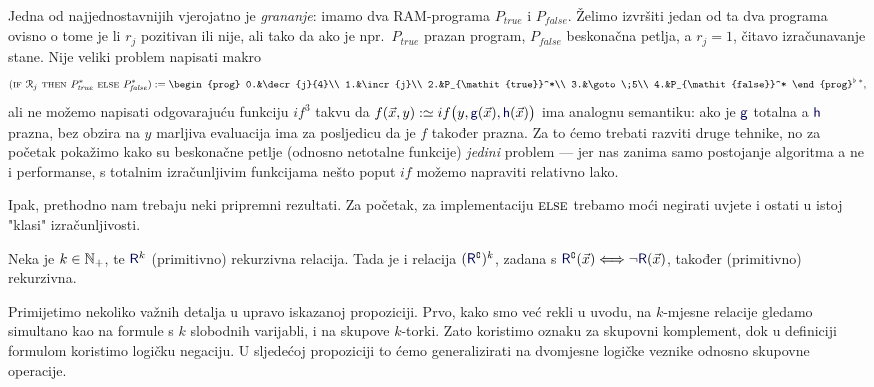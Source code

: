 Jedna od najjednostavnijih vjerojatno je \emph{grananje}: imamo dva RAM-programa $P_{\mathit{true}}$ i $P_{\mathit{false}}$. Želimo izvršiti jedan od ta dva programa ovisno o tome je li $r_j$ pozitivan ili nije, ali tako da ako je npr.\ $P_{\mathit{true}}$ prazan program, $P_{\mathit{false}}$ beskonačna petlja, a $r_j=1$, čitavo izračunavanje stane. Nije veliki problem napisati makro
\begin{equation}
    (\textsc{if $\reg{j}$ then $P_{\mathit{true}}^*$ else $P_{\mathit{false}}^*$}):=\begin{prog}
    0.&\decr{j}{4}\\
    1.&\incr{j}\\
    2.&P_{\mathit{true}}^*\\
    3.&\goto\;5\\
    4.&P_{\mathit{false}}^*
    \end{prog}^{\flat\;*}\text,
\end{equation}
ali ne možemo napisati odgovarajuću funkciju $if^3$ takvu da $f(\vec x,y):\simeq if\bigl(y,\f g(\vec x),\f h(\vec x)\bigr)$ ima analognu semantiku: ako je $\f g$ totalna a $\f h$ prazna, bez obzira na $y$ marljiva evaluacija ima za posljedicu da je $f$ također prazna. Za to ćemo trebati razviti druge tehnike, no za početak pokažimo kako su beskonačne petlje (odnosno netotalne funkcije) \emph{jedini} problem --- jer nas zanima samo postojanje algoritma a ne i performanse, s totalnim izračunljivim funkcijama nešto poput $if$ možemo napraviti relativno lako. 

Ipak, prethodno nam trebaju neki pripremni rezultati. Za početak, za implementaciju $\textsc{else}$ trebamo moći negirati uvjete i ostati u istoj "klasi" izračunljivosti.

\begin{propozicija}\label{prop:kompl}
Neka je $k\in{\mathbb N}_+$, te $\f R^k$ (primitivno) rekurzivna relacija. Tada je i relacija $(\f R\kompl)^k$, zadana s $\f R\kompl(\vec x)\Longleftrightarrow\lnot \f R(\vec x)$, također (primitivno) rekurzivna.
\end{propozicija}

Primijetimo nekoliko važnih detalja u upravo iskazanoj propoziciji. Prvo, kako smo već rekli u uvodu, na $k$-mjesne relacije gledamo simultano kao na formule s $k$ slobodnih varijabli, i na skupove $k$-torki. Zato koristimo oznaku za skupovni komplement, dok u definiciji formulom koristimo logičku negaciju. U sljedećoj propoziciji to ćemo generalizirati na dvomjesne logičke veznike odnosno skupovne operacije.

